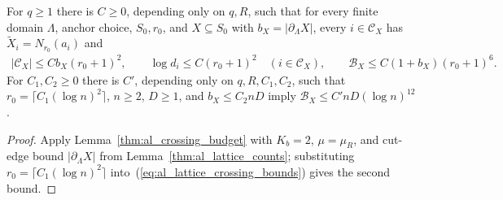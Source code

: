\begin{lemma}
    \label{thm:al_lattice_crossing_budget}
    \leanok
    For $q\ge1$ there is $C\ge0$, depending only on $q,R$, such that for every
    finite domain $\Lambda$, anchor choice, $S_0,r_0$, and $X\subseteq S_0$ with
    $b_X=|\partial_\Lambda X|$, every $i\in\mathcal C_X$ has
    $\widetilde X_i=N_{r_0}(a_i)$ and
    \begin{align}
        |\mathcal C_X|\le Cb_X(r_0+1)^2,\qquad
        \log d_i\le C(r_0+1)^2\quad(i\in\mathcal C_X),\qquad
        \mathcal B_X\le C(1+b_X)(r_0+1)^6.
        \label{eq:al_lattice_crossing_bounds}
    \end{align}
    For $C_1,C_2\ge0$ there is $C'$, depending only on $q,R,C_1,C_2$, such that
    $r_0=\lceil C_1(\log n)^2\rceil$, $n\ge2$, $D\ge1$, and $b_X\le C_2nD$
    imply $\mathcal B_X\le C'nD(\log n)^{12}$
    \cite[Proposition~4.5]{OpenAI2026AreaLaw}.
\end{lemma}
\begin{proof}\leanok
    Apply Lemma~\ref{thm:al_crossing_budget} with $K_b=2$, $\mu=\mu_R$, and
    cut-edge bound $|\partial_\Lambda X|$ from Lemma~\ref{thm:al_lattice_counts};
    substituting $r_0=\lceil C_1(\log n)^2\rceil$ into~(\ref{eq:al_lattice_crossing_bounds})
    gives the second bound.
\end{proof}


